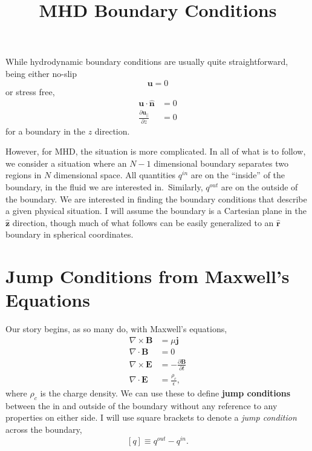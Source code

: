 \documentclass[11pt]{article}
\title{MHD Boundary Conditions}
\newcommand{\norm}{\hat{\mathbf{n}}}
\begin{document}
\maketitle

While hydrodynamic boundary conditions are usually quite straightforward, being either no-slip
\begin{equation}
  \label{eq:no-slip}
  \mathbf{u} = 0
\end{equation}
or stress free,
\begin{align}
  \label{eq:stress-free}
  \mathbf{u} \cdot \norm &= 0\\
  \frac{\partial \mathbf{u}_\parallel}{\partial z} &= 0
\end{align}
for a boundary in the $z$ direction.

However, for MHD, the situation is more complicated.
In all of what is to follow, we consider a situation where an $N-1$ dimensional boundary separates two regions in $N$ dimensional space.
All quantities $q^{in}$ are on the ``inside'' of the boundary, in the fluid we are interested in.\ Similarly, $q^{out}$ are on the outside of the boundary.
We are interested in finding the boundary conditions that describe a given physical situation.
I will assume the boundary is a Cartesian plane in the $\hat{\mathbf{z}}$ direction, though much of what follows can be easily generalized to an $\hat{\mathbf{r}}$ boundary in spherical coordinates.

\section{Jump Conditions from Maxwell's Equations}
\label{sec:jump}
Our story begins, as so many do, with Maxwell's equations,
\begin{align}
  \nabla \times \mathbf{B} &= \mu \mathbf{j} \label{eq:curlB}\\
  \nabla \cdot \mathbf{B} &= 0 \label{eq:divB}\\
  \nabla \times \mathbf{E} &= -\frac{\partial \mathbf{B}}{\partial t} \label{eq:curlE}\\
  \nabla \cdot \mathbf{E} &= \frac{\rho_c}{\epsilon} \label{eq:divE},
\end{align}
where $\rho_c$ is the charge density.
We can use these to define \textbf{jump conditions} between the in and outside of the boundary without any reference to any properties on either side.
I will use square brackets to denote a \emph{jump condition} across the boundary,
\begin{equation}
  \label{eq:jump}
  [q] \equiv q^{out} - q^{in}.
\end{equation}
\end{document}
